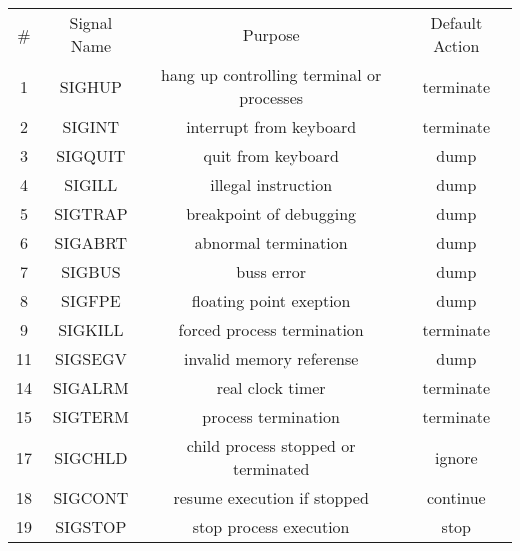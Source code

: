 \documentclass[a4paper,12pt]{article}
\begin{document}
\begin{flushleft}
\begin{enumerate}
\begin{tabular}{c c c c}
\\ \# & Signal Name & Purpose &  Default Action\\
1 & SIGHUP & {\color{red}hang up controlling terminal or processes} & {\color{red} terminate}\\
2 & SIGINT  & {\color{red}interrupt from keyboard} & {\color{red}terminate} \\
3 & SIGQUIT  & {\color{red}quit from keyboard} & {\color{red} dump} \\
4 & SIGILL  & {\color{red} illegal instruction} & {\color{red} dump} \\ 
5 & SIGTRAP  & {\color{red} breakpoint of debugging} & {\color{red} dump}\\
6 & SIGABRT  & {\color{red} abnormal termination} & {\color{red} dump}\\
7 & SIGBUS  & {\color{red} buss error} & {\color{red} dump}\\
8 & SIGFPE  &{\color{red} floating point exeption} & {\color{red} dump}\\
9 & SIGKILL  & {\color{red} forced process termination} & {\color{red} terminate}\\
11 & SIGSEGV  & {\color{red} invalid memory referense} & {\color{red} dump}\\
14 & SIGALRM  & {\color{red} real clock timer} & {\color{red} terminate}\\
15 & SIGTERM  & {\color{red} process termination} & {\color{red} terminate}\\
17 & SIGCHLD  & {\color{red} child process stopped or terminated} & {\color{red} ignore}\\
18 & SIGCONT  & {\color{red} resume execution if stopped} & {\color{red} continue}\\
19 & SIGSTOP  & {\color{red} stop process execution} & {\color{red} stop}\\
\end{tabular}




\end{enumerate}
\end{flushleft}
\end{document}
